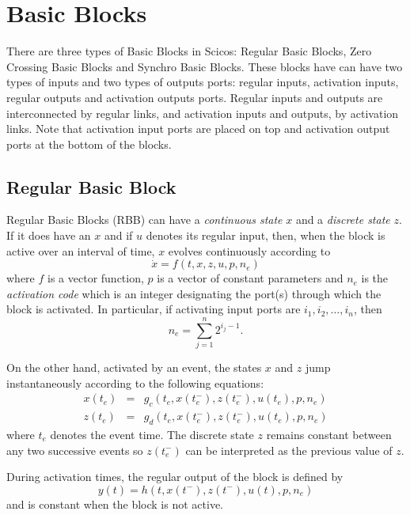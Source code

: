 \documentclass{article}
\begin{document}
\section{Basic Blocks}
There are three types of Basic Blocks in Scicos: Regular Basic Blocks,
Zero Crossing Basic Blocks and Synchro Basic Blocks. These blocks have can have two types of
inputs and two types of outputs ports: regular inputs, activation inputs,
regular 
outputs and activation outputs ports. Regular inputs and outputs are
interconnected by regular links, and activation inputs and outputs, by
activation links. Note that activation input ports are placed on top and activation output
ports at the bottom of the blocks. 

\subsection{Regular Basic Block}
Regular Basic Blocks (RBB) can have a {\em continuous state} $x$ and a 
{\em discrete state} $z$. If it does have an $x$ and if $u$ denotes its regular input, then,
when the block is active over an interval of time, $x$ evolves continuously according to
\begin{equation}
\dot{x} = f(t,x,z,u,p,n_{e}) \label{e1}
\end{equation}
where $f$ is a vector function, $p$ is a vector of
constant parameters and $n_{e}$ is the {\em activation
code} which is an integer designating the port(s)  through which the block is
activated. In particular, if activating input ports are
$i_1,i_2,\dots,i_n$, then
\[
n_{e}=\sum_{j=1}^n 2^{i_j-1}.
\]

On the other hand, activated by an event, the states $x$ and $z$ jump
instantaneously according to the following equations:
\begin{eqnarray}
x(t_e) &=& g_c(t_e,x(t_e^-),z(t_e^-),u(t_e),p,n_{e}) \label{e11}\\
z(t_e) &=& g_d(t_e,x(t_e^-),z(t_e^-),u(t_e),p,n_{e}) \label{e12}
\end{eqnarray}
where $t_e$ denotes the event time. The discrete state $z$ remains constant 
between any two successive events so $z(t_e^-)$ can be interpreted as the previous value of $z$.

During activation times, the regular output of the block is defined by
\begin{equation}
y(t)=h(t,x(t^-),z(t^-),u(t),p,n_{e}) \label{e2}
\end{equation}
and is constant when the block is not active.
\end{document}
